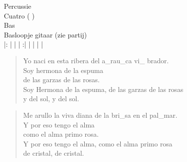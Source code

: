 Percussie\\
Cuatro ( )\\
Bas\\
Basloopje gitaar (zie partij)\\

|:  |  |  | :|  | |  | | \\

\begin{verse}
Yo naci en esta ribera del a\_rau\_ca vi\_  brador. \hspace{1em}  \hspace{1em}  \hspace{1em}\\
  Soy hermona de la espuma  \hspace{1em} \hspace{1em}  \hspace{1em}\\
  de las garzas de las rosas.  \hspace{1em} \hspace{1em}  \hspace{1em}\\
  Soy Hermona de la espuma, de las garzas de las rosas\\
y del sol, y del sol.   \hspace{2em}\\
\end{verse}

\begin{verse}
Me arullo la viva diana de la bri\_sa en el   pal\_mar.  \hspace{1em} \hspace{1em}  \hspace{1em}\\
  Y por eso tengo el alma  \hspace{1em} \hspace{1em}  \hspace{1em}\\
  como el alma primo rosa.  \hspace{1em} \hspace{1em}  \hspace{1em}\\
  Y por eso tengo el alma, como el alma primo rosa\\
de cristal, de cristal.  \\
\end{verse}

